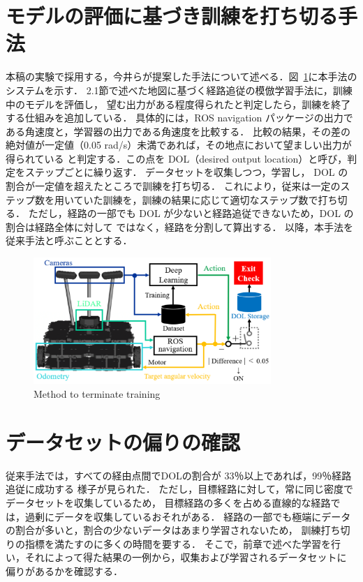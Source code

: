 \documentclass{jarticle}
\renewcommand{\figurename}{図~}
\newcommand{\figref}[1]{\figurename\ref{#1}}
\begin{document}
\section{モデルの評価に基づき訓練を打ち切る手法}
本稿の実験で採用する，今井らが提案した手法について述べる．\figref{fig:5}に本手法のシステムを示す．
2.1節で述べた地図に基づく経路追従の模倣学習手法に，訓練中のモデルを評価し，
望む出力がある程度得られたと判定したら，訓練を終了する仕組みを追加している．
具体的には，ROS navigation パッケージの出力である角速度と，学習器の出力である角速度を比較する．
比較の結果，その差の絶対値が一定値（0.05 rad/s）未満であれば，その地点において望ましい出力が得られている
と判定する．この点を DOL（desired output location）と呼び，判定をステップごとに繰り返す．
データセットを収集しつつ，学習し， DOL の割合が一定値を超えたところで訓練を打ち切る．
これにより，従来は一定のステップ数を用いていた訓練を，訓練の結果に応じて適切なステップ数で打ち切る．
ただし，経路の一部でも DOL が少ないと経路追従できないため，DOL の割合は経路全体に対して
ではなく，経路を分割して算出する．
以降，本手法を従来手法と呼ぶこととする．

\begin{figure}[h!]
  \centering
   \includegraphics[height=48mm]{./pdf/moderu.pdf}
   \caption{Method to terminate training}
   \label{fig:5}
\end{figure}



\section{データセットの偏りの確認}
従来手法では，すべての経由点間でDOLの割合が 33％以上であれば，99％経路追従に成功する
様子が見られた\cite{imai2}．
ただし，目標経路に対して，常に同じ密度でデータセットを収集しているため，
目標経路の多くを占める直線的な経路では，過剰にデータを収集しているおそれがある．
経路の一部でも極端にデータの割合が多いと，割合の少ないデータはあまり学習されないため，
訓練打ち切りの指標を満たすのに多くの時間を要する．
そこで，前章で述べた学習を行い，それによって得た結果の一例から，収集および学習されるデータセットに
偏りがあるかを確認する．
\end{document}
